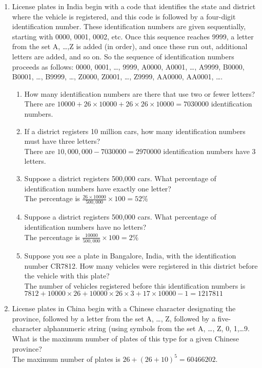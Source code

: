 \documentclass[10pt]{article}
\begin{document}
\begin{enumerate}
  \item License plates in India begin with a code that identifies the state and district where the vehicle is registered, and this code is followed by a four-digit identification number. These identification numbers are given sequentially, starting with 0000, 0001, 0002, etc. Once this sequence reaches 9999, a letter from the set {A, …,Z} is added (in order), and once these run out, additional letters are added, and so on. So the sequence of identification numbers proceeds as follows: 0000, 0001, …, 9999, A0000, A0001, …, A9999, B0000, B0001, …, B9999, …, Z0000, Z0001, …, Z9999, AA0000, AA0001, ….
  \begin{enumerate}
    \item How many identification numbers are there that use two or fewer letters?\\
    There are $10000 + 26 \times 10000 + 26 \times 26 \times 10000 = 7030000$ identification numbers.
    \item If a district registers 10 million cars, how many identification numbers must have three letters?\\
    There are $10,000,000 - 7030000 = 2970000$ identification numbers have 3 letters.
    \item Suppose a district registers 500,000 cars. What percentage of identification numbers have exactly one letter?\\
    The percentage is $\frac{26 \times 10000}{500,000} \times 100 = 52\%$
    \item Suppose a district registers 500,000 cars. What percentage of identification numbers have no letters?\\
    The percentage is $\frac{10000}{500,000} \times 100 = 2\%$
    \item Suppose you see a plate in Bangalore, India, with the identification number CR7812. How many vehicles were registered in this district before the vehicle with this plate?\\
    The number of vehicles registered before this identification numbers is $7812 + 10000 \times 26 + 10000 \times 26 \times 3 + 17 \times 10000 -1 = 1217811$
  \end{enumerate}

  \item License plates in China begin with a Chinese character designating the province, followed by a letter from the set {A, …, Z}, followed by a five-character alphanumeric string (using symbols from the set {A, …, Z, 0, 1,…9}. What is the maximum number of plates of this type for a given Chinese province?\\
  The maximum number of plates is $26 + (26+10)^5 = 60466202$.


\end{enumerate}
\end{document}
